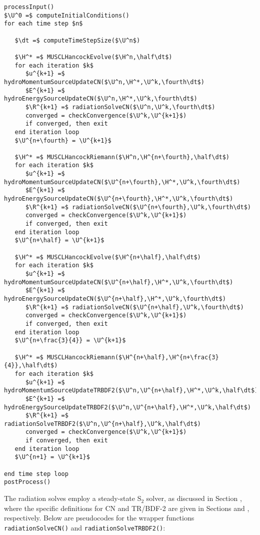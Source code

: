 \documentclass[preprint,12pt]{elsarticle}
\begin{document}
\begin{lstlisting}[mathescape,columns=fullflexible,
   basicstyle=\fontfamily{lmvtt}\selectfont]
processInput()
$\U^0 =$ computeInitialConditions()
for each time step $n$

   $\dt =$ computeTimeStepSize($\U^n$)

   $\H^* =$ MUSCLHancockEvolve($\H^n,\half\dt$)
   for each iteration $k$
      $u^{k+1} =$ hydroMomentumSourceUpdateCN($\U^n,\H^*,\U^k,\fourth\dt$)
      $E^{k+1} =$ hydroEnergySourceUpdateCN($\U^n,\H^*,\U^k,\fourth\dt$)
      $\R^{k+1} =$ radiationSolveCN($\U^n,\U^k,\fourth\dt$)
      converged = checkConvergence($\U^k,\U^{k+1}$)
      if converged, then exit
   end iteration loop
   $\U^{n+\fourth} = \U^{k+1}$

   $\H^* =$ MUSCLHancockRiemann($\H^n,\H^{n+\fourth},\half\dt$)
   for each iteration $k$
      $u^{k+1} =$ hydroMomentumSourceUpdateCN($\U^{n+\fourth},\H^*,\U^k,\fourth\dt$)
      $E^{k+1} =$ hydroEnergySourceUpdateCN($\U^{n+\fourth},\H^*,\U^k,\fourth\dt$)
      $\R^{k+1} =$ radiationSolveCN($\U^{n+\fourth},\U^k,\fourth\dt$)
      converged = checkConvergence($\U^k,\U^{k+1}$)
      if converged, then exit
   end iteration loop
   $\U^{n+\half} = \U^{k+1}$

   $\H^* =$ MUSCLHancockEvolve($\H^{n+\half},\half\dt$)
   for each iteration $k$
      $u^{k+1} =$ hydroMomentumSourceUpdateCN($\U^{n+\half},\H^*,\U^k,\fourth\dt$)
      $E^{k+1} =$ hydroEnergySourceUpdateCN($\U^{n+\half},\H^*,\U^k,\fourth\dt$)
      $\R^{k+1} =$ radiationSolveCN($\U^{n+\half},\U^k,\fourth\dt$)
      converged = checkConvergence($\U^k,\U^{k+1}$)
      if converged, then exit
   end iteration loop
   $\U^{n+\frac{3}{4}} = \U^{k+1}$

   $\H^* =$ MUSCLHancockRiemann($\H^{n+\half},\H^{n+\frac{3}{4}},\half\dt$)
   for each iteration $k$
      $u^{k+1} =$ hydroMomentumSourceUpdateTRBDF2($\U^n,\U^{n+\half},\H^*,\U^k,\half\dt$)
      $E^{k+1} =$ hydroEnergySourceUpdateTRBDF2($\U^n,\U^{n+\half},\H^*,\U^k,\half\dt$)
      $\R^{k+1} =$ radiationSolveTRBDF2($\U^n,\U^{n+\half},\U^k,\half\dt$)
      converged = checkConvergence($\U^k,\U^{k+1}$)
      if converged, then exit
   end iteration loop
   $\U^{n+1} = \U^{k+1}$

end time step loop
postProcess()
\end{lstlisting}

The radiation solves employ a steady-state S$_2$ solver, as discussed
in Section , where the specific definitions for
CN and TR/BDF-2 are given in Sections  and ,
respectively. Below are pseudocodes for the wrapper functions
\texttt{radiationSolveCN()} and \texttt{radiationSolveTRBDF2()}:
\end{document}
